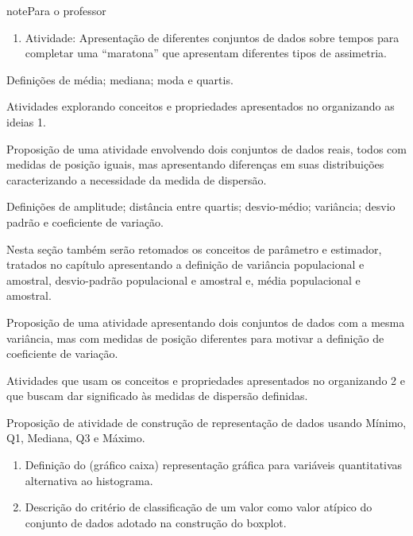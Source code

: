 \begin{sphinxadmonition}{note}{Para o professor}
\begin{enumerate}
\item {} 
Atividade: Apresentação de diferentes conjuntos de dados sobre tempos para completar uma “maratona” que apresentam diferentes tipos de assimetria.

\end{enumerate}

 Definições de média; mediana; moda e quartis.

 Atividades explorando conceitos e propriedades apresentados no organizando as ideias 1.

 Proposição de uma atividade envolvendo dois conjuntos de dados reais, todos com medidas de posição iguais, mas apresentando diferenças em suas distribuições caracterizando a necessidade da medida de dispersão.

  Definições de amplitude; distância entre quartis; desvio-médio; variância; desvio padrão e coeficiente de variação.

Nesta seção também  serão retomados os conceitos de parâmetro e estimador, tratados no capítulo  apresentando a definição de variância populacional e amostral, desvio-padrão populacional e amostral e, média populacional e amostral.

Proposição de uma atividade apresentando dois conjuntos de dados com a mesma variância, mas com medidas de posição diferentes para motivar a definição de coeficiente de variação.

 Atividades que usam os conceitos e propriedades apresentados no organizando 2 e que buscam dar significado às medidas de dispersão definidas.

 Proposição de atividade de construção de representação de dados usando Mínimo, Q1, Mediana, Q3 e Máximo.

\begin{enumerate}
\item {} 
Definição do  (gráfico caixa) representação gráfica para variáveis quantitativas alternativa ao histograma.

\item {} 
Descrição do critério de classificação de um valor como valor atípico do conjunto de dados adotado na construção do boxplot.


\end{enumerate}
\end{sphinxadmonition}
